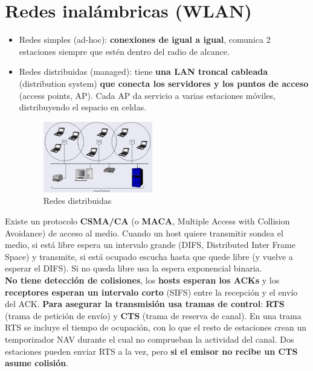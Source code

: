 \documentclass{article}
\begin{document}
\newpage

\section{Redes inalámbricas (WLAN)}
\begin{itemize}
    \item Redes simples (ad-hoc): \textbf{conexiones de igual a igual}, comunica 2 estaciones siempre que estén dentro del radio de alcance.
    
    \item Redes distribuidas (managed): tiene \textbf{una LAN troncal cableada} (distribution system) \textbf{que conecta los servidores y los puntos de acceso} (access points, AP). Cada AP da servicio a varias estaciones móviles, distribuyendo el espacio en celdas.
        \begin{figure}[h]
        \centering
        \includegraphics[width=0.45\textwidth]{img-t5/img_436_39.png}
        \caption{Redes distribuidas}
        \end{figure}    
\end{itemize}

Existe un protocolo \textbf{CSMA/CA} (o \textbf{MACA}, Multiple Access with Collision Avoidance) de acceso al medio. Cuando un host quiere transmitir sondea el medio, si está libre espera un intervalo grande (DIFS, Distributed Inter Frame Space) y transmite, si está ocupado escucha hasta que quede libre (y vuelve a esperar el DIFS). Si no queda libre usa la espera exponencial binaria. \\
\textbf{No tiene detección de colisiones}, los \textbf{hosts esperan los ACKs} y los \textbf{receptores esperan un intervalo corto} (SIFS) entre la recepción y el envío del ACK. \textbf{Para asegurar la transmisión usa tramas de control}: \textbf{RTS} (trama de petición de envío) y \textbf{CTS} (trama de reserva de canal). En una trama RTS se incluye el tiempo de ocupación, con lo que el resto de estaciones crean un temporizador NAV durante el cual no comprueban la actividad del canal. Dos estaciones pueden enviar RTS a la vez, pero \textbf{si el emisor no recibe un CTS asume colisión}.
\end{document}
